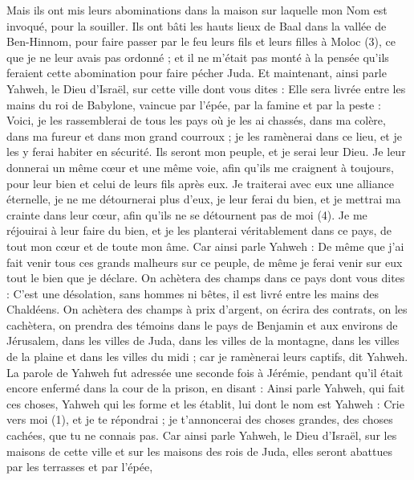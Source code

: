 \begin{multicols}{2}
Mais ils ont mis leurs abominations dans la maison sur laquelle mon Nom est invoqué, pour la souiller.
Ils ont bâti les hauts lieux de Baal dans la vallée de Ben-Hinnom, pour faire passer par le feu leurs fils et leurs filles à Moloc\FTNT{} (3), ce que je ne leur avais pas ordonné ; et il ne m'était pas monté à la pensée qu'ils feraient cette abomination pour faire pécher Juda.
Et maintenant, ainsi parle Yahweh, le Dieu d'Israël, sur cette ville dont vous dites : Elle sera livrée entre les mains du roi de Babylone, vaincue par l'épée, par la famine et par la peste :
Voici, je les rassemblerai de tous les pays où je les ai chassés, dans ma colère, dans ma fureur et dans mon grand courroux ;  je les ramènerai dans ce lieu, et je les y ferai habiter en sécurité.
Ils seront mon peuple, et je serai leur Dieu.
Je leur donnerai un même cœur et une même voie, afin qu'ils me craignent à toujours, pour leur bien et celui de leurs fils après eux.
Je traiterai avec eux une alliance éternelle, je ne me détournerai plus d'eux, je leur ferai du bien, et je mettrai ma crainte dans leur cœur, afin qu'ils ne se détournent pas de moi\FTNT{} (4).
Je me réjouirai à leur faire du bien, et je les planterai véritablement dans ce pays, de tout mon cœur et de toute mon âme.
Car ainsi parle Yahweh : De même que j'ai fait venir tous ces grands malheurs sur ce peuple, de même je ferai venir sur eux tout le bien que je déclare.
On achètera des champs dans ce pays dont vous dites : C’est une désolation, sans hommes ni bêtes, il est livré entre les mains des Chaldéens.
On achètera des champs à prix d'argent, on écrira des contrats, on les cachètera, on prendra des témoins dans le pays de Benjamin et aux environs de Jérusalem, dans les villes de Juda, dans les villes de la montagne, dans les villes de la plaine et dans les villes du midi ; car je ramènerai leurs captifs, dit Yahweh.
\VerseOne{}La parole de Yahweh fut adressée une seconde fois à Jérémie, pendant qu’il était encore enfermé dans la cour de la prison, en disant :
Ainsi parle Yahweh, qui fait ces choses, Yahweh qui les forme et les établit, lui dont le nom est Yahweh :
Crie vers moi\FTNT{} (1), et je te répondrai ; je t’annoncerai des choses grandes, des choses cachées, que tu ne connais pas.
Car ainsi parle Yahweh, le Dieu d'Israël, sur les maisons de cette ville et sur les maisons des rois de Juda, elles seront abattues par les terrasses et par l'épée,

\end{multicols}
